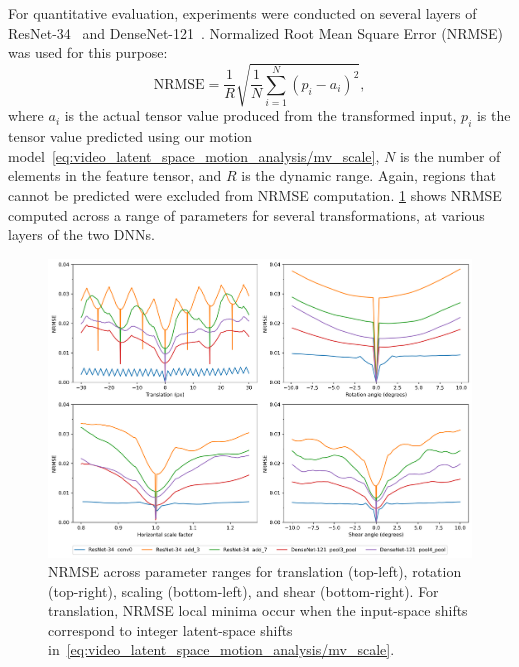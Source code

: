 For quantitative evaluation, experiments were conducted on several layers of ResNet-34~\cite{ResNet} and DenseNet-121~\cite{DenseNet}. Normalized Root Mean Square Error (NRMSE)~\cite{wiki:NRMSE} was used for this purpose:
\begin{equation}
    \text{NRMSE} =  \frac{1}{R} \sqrt{\frac{1}{N} \sum_{i=1}^N (p_i - a_i)^2},
    \label{eq:video_latent_space_motion_analysis/NRMSE}
\end{equation}
where $a_i$ is the actual tensor value produced %
from the transformed input, $p_i$
is the tensor value predicted using our motion model~\cref{eq:video_latent_space_motion_analysis/mv_scale}, $N$ is the number of elements in the feature tensor, and $R$ is the dynamic range. Again, regions that cannot be predicted were excluded from NRMSE computation. \cref{fig:video_latent_space_motion_analysis/transform} shows NRMSE computed across a range of parameters for several transformations, at various layers of the two DNNs. %


\begin{figure}[tb]
    \centering
    \includegraphics[width=\linewidth]{img/video_latent_space_motion_analysis/nrmse/transform_curves-all.png}
    \caption{%
        NRMSE across parameter ranges for translation (top-left), rotation (top-right), scaling (bottom-left), and shear (bottom-right).
        For translation, NRMSE local minima occur when the input-space shifts correspond to integer latent-space shifts in~\cref{eq:video_latent_space_motion_analysis/mv_scale}.%
    }
    \label{fig:video_latent_space_motion_analysis/transform}
\end{figure}



